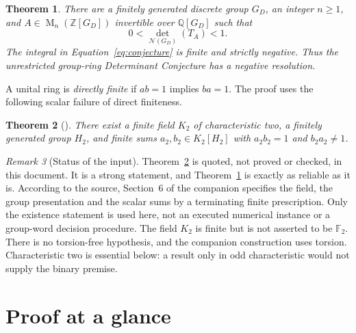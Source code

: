 \documentclass[11pt]{article}
\newtheorem{theorem}{Theorem}[section]
\theoremstyle{remark}
\newtheorem{remark}[theorem]{Remark}
\numberwithin{equation}{section}
\newcommand{\F}{\mathbb F}
\newcommand{\Z}{\mathbb Z}
\newcommand{\Q}{\mathbb Q}
\newcommand{\Mat}{\operatorname{M}}
\newcommand{\N}{\mathcal N}
\begin{document}
\begin{theorem}\label{thm:main}
There are a finitely generated discrete group $G_D$, an integer
$n\ge1$, and $A\in\Mat_n(\Z[G_D])$ invertible over $\Q[G_D]$ such
that
\[
 0<\det_{\N(G_D)}(T_A)<1.
\]
The integral in Equation~\eqref{eq:conjecture} is finite and strictly
negative. Thus the unrestricted group-ring Determinant Conjecture
has a negative resolution.
\end{theorem}

A unital ring is \emph{directly finite} if $ab=1$ implies $ba=1$. The proof uses the following scalar failure of direct finiteness.

\begin{theorem}[{\cite[Theorem 1.1]{CharacteristicTwo}}]
\label{thm:input}
There exist a finite field $K_2$ of characteristic two, a finitely
generated group $H_2$, and finite sums $a_2,b_2\in K_2[H_2]$ with
$a_2b_2=1$ and $b_2a_2\ne1$.
\end{theorem}

\begin{remark}[Status of the input]\label{rem:input}
Theorem~\ref{thm:input} is quoted, not proved or checked, in this document. It is a strong statement, and Theorem~\ref{thm:main} is exactly as reliable as it is. According to the source, Section~6 of the companion specifies the field, the group presentation and the scalar sums by a terminating finite prescription. Only the existence statement is used here, not an executed numerical instance or a group-word decision procedure. The field $K_2$ is finite but is not asserted to be $\F_2$. There is no torsion-free hypothesis, and the companion construction uses torsion. Characteristic two is essential below: a result only in odd characteristic would not supply the binary premise.
\end{remark}

\section{Proof at a glance}
\label{sec:glance}
\end{document}
